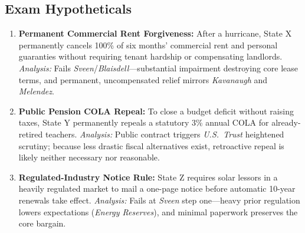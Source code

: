 \documentclass[12pt]{article}
\begin{document}
\subsection{Exam Hypotheticals}
\begin{enumerate}
  \item \textbf{Permanent Commercial Rent Forgiveness:} After a hurricane, State X permanently cancels 100\% of six months' commercial rent and personal guaranties without requiring tenant hardship or compensating landlords. \emph{Analysis:} Fails \emph{Sveen}/\emph{Blaisdell}---substantial impairment destroying core lease terms, and permanent, uncompensated relief mirrors \emph{Kavanaugh} and \emph{Melendez}.
  \item \textbf{Public Pension COLA Repeal:} To close a budget deficit without raising taxes, State Y permanently repeals a statutory 3\% annual COLA for already-retired teachers. \emph{Analysis:} Public contract triggers \emph{U.S.\ Trust} heightened scrutiny; because less drastic fiscal alternatives exist, retroactive repeal is likely neither necessary nor reasonable.
  \item \textbf{Regulated-Industry Notice Rule:} State Z requires solar lessors in a heavily regulated market to mail a one-page notice before automatic 10-year renewals take effect. \emph{Analysis:} Fails at \emph{Sveen} step one---heavy prior regulation lowers expectations (\emph{Energy Reserves}), and minimal paperwork preserves the core bargain.
\end{enumerate}
\end{document}
